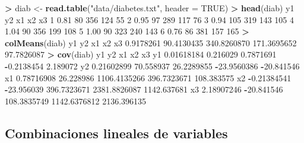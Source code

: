 \documentclass[
  a4paper,
  oneside]{scrbook}
\newenvironment{Shaded}{\begin{snugshade}}{\end{snugshade}}
\newcommand{\AttributeTok}[1]{\textcolor[rgb]{0.13,0.29,0.53}{#1}}
\newcommand{\ConstantTok}[1]{\textcolor[rgb]{0.56,0.35,0.01}{#1}}
\newcommand{\DecValTok}[1]{\textcolor[rgb]{0.00,0.00,0.81}{#1}}
\newcommand{\FloatTok}[1]{\textcolor[rgb]{0.00,0.00,0.81}{#1}}
\newcommand{\FunctionTok}[1]{\textcolor[rgb]{0.13,0.29,0.53}{\textbf{#1}}}
\newcommand{\NormalTok}[1]{#1}
\newcommand{\OtherTok}[1]{\textcolor[rgb]{0.56,0.35,0.01}{#1}}
\newcommand{\SpecialCharTok}[1]{\textcolor[rgb]{0.81,0.36,0.00}{\textbf{#1}}}
\newcommand{\StringTok}[1]{\textcolor[rgb]{0.31,0.60,0.02}{#1}}
\theoremstyle{definition}
\theoremstyle{definition}
\theoremstyle{definition}
\theoremstyle{definition}
\theoremstyle{remark}
\begin{document}
\begin{Shaded}
\begin{Highlighting}[]
\SpecialCharTok{\textgreater{}}\NormalTok{ diab }\OtherTok{\textless{}{-}} \FunctionTok{read.table}\NormalTok{(}\StringTok{"data/diabetes.txt"}\NormalTok{, }\AttributeTok{header =} \ConstantTok{TRUE}\NormalTok{)}
\SpecialCharTok{\textgreater{}} \FunctionTok{head}\NormalTok{(diab)}
\NormalTok{    y1  y2  x1  x2  x3}
\DecValTok{1} \FloatTok{0.81}  \DecValTok{80} \DecValTok{356} \DecValTok{124}  \DecValTok{55}
\DecValTok{2} \FloatTok{0.95}  \DecValTok{97} \DecValTok{289} \DecValTok{117}  \DecValTok{76}
\DecValTok{3} \FloatTok{0.94} \DecValTok{105} \DecValTok{319} \DecValTok{143} \DecValTok{105}
\DecValTok{4} \FloatTok{1.04}  \DecValTok{90} \DecValTok{356} \DecValTok{199} \DecValTok{108}
\DecValTok{5} \FloatTok{1.00}  \DecValTok{90} \DecValTok{323} \DecValTok{240} \DecValTok{143}
\DecValTok{6} \FloatTok{0.76}  \DecValTok{86} \DecValTok{381} \DecValTok{157} \DecValTok{165}
\SpecialCharTok{\textgreater{}} \FunctionTok{colMeans}\NormalTok{(diab)}
\NormalTok{         y1          y2          x1          x2          x3 }
  \FloatTok{0.9178261}  \FloatTok{90.4130435} \FloatTok{340.8260870} \FloatTok{171.3695652}  \FloatTok{97.7826087} 
\SpecialCharTok{\textgreater{}} \FunctionTok{cov}\NormalTok{(diab)}
\NormalTok{            y1         y2           x1           x2          x3}
\NormalTok{y1  }\FloatTok{0.01618184}   \FloatTok{0.216029}    \FloatTok{0.7871691}   \SpecialCharTok{{-}}\FloatTok{0.2138454}    \FloatTok{2.189072}
\NormalTok{y2  }\FloatTok{0.21602899}  \FloatTok{70.558937}   \FloatTok{26.2289855}  \SpecialCharTok{{-}}\FloatTok{23.9560386}  \SpecialCharTok{{-}}\FloatTok{20.841546}
\NormalTok{x1  }\FloatTok{0.78716908}  \FloatTok{26.228986} \FloatTok{1106.4135266}  \FloatTok{396.7323671}  \FloatTok{108.383575}
\NormalTok{x2 }\SpecialCharTok{{-}}\FloatTok{0.21384541} \SpecialCharTok{{-}}\FloatTok{23.956039}  \FloatTok{396.7323671} \FloatTok{2381.8826087} \FloatTok{1142.637681}
\NormalTok{x3  }\FloatTok{2.18907246} \SpecialCharTok{{-}}\FloatTok{20.841546}  \FloatTok{108.3835749} \FloatTok{1142.6376812} \FloatTok{2136.396135}
\end{Highlighting}
\end{Shaded}

\normalsize

\subsection{Combinaciones lineales de variables}\label{combinaciones-lineales-de-variables}
\end{document}
